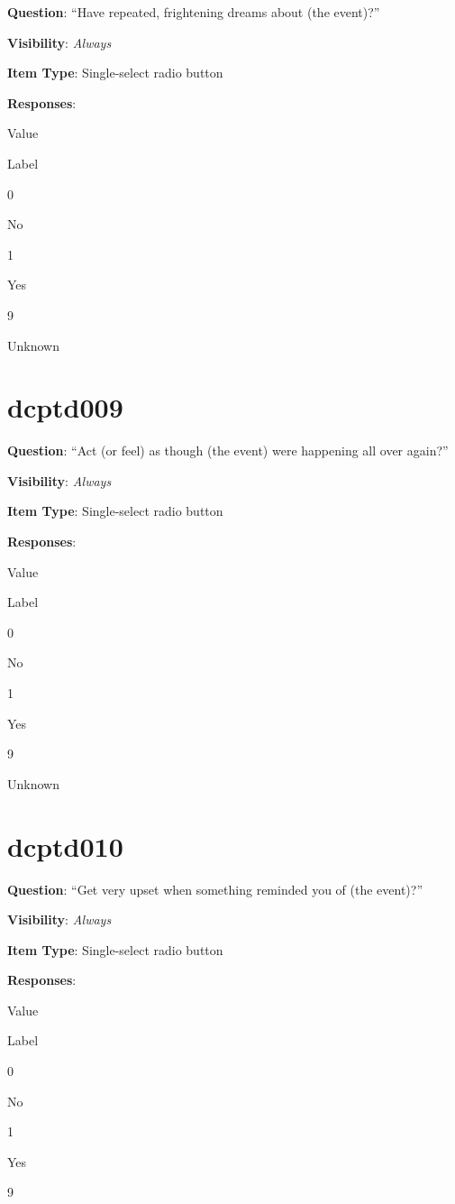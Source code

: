 \documentclass[]{book}
\begin{document}
\textbf{Question}: ``Have repeated, frightening dreams about (the event)?''

\textbf{Visibility}: \emph{Always}

\textbf{Item Type}: Single-select radio button

\textbf{Responses}:

Value

Label

0

No

1

Yes

9

Unknown

\hypertarget{dcptd009}{%
\section{dcptd009}\label{dcptd009}}

\textbf{Question}: ``Act (or feel) as though (the event) were happening all over again?''

\textbf{Visibility}: \emph{Always}

\textbf{Item Type}: Single-select radio button

\textbf{Responses}:

Value

Label

0

No

1

Yes

9

Unknown

\hypertarget{dcptd010}{%
\section{dcptd010}\label{dcptd010}}

\textbf{Question}: ``Get very upset when something reminded you of (the event)?''

\textbf{Visibility}: \emph{Always}

\textbf{Item Type}: Single-select radio button

\textbf{Responses}:

Value

Label

0

No

1

Yes

9
\end{document}
